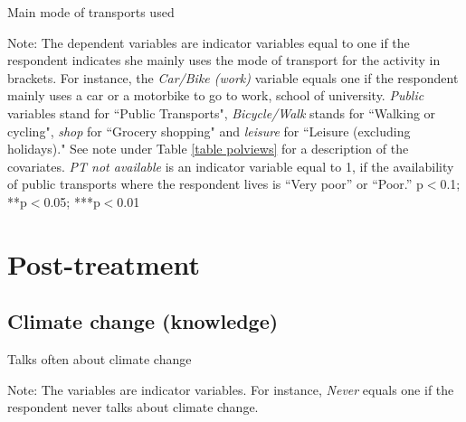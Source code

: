 \documentclass{article}
\begin{document}
\begin{landscape}
\begin{table}[h!]
	\caption{Main mode of transports used}
	\begin{center}
		\scalebox{0.6}{}
	\end{center}
	{\footnotesize Note: The dependent variables are indicator variables equal to one if the respondent indicates she mainly uses the mode of transport for the activity in brackets. For instance, the \textit{Car/Bike (work)} variable equals one if the respondent mainly uses a car or a motorbike to go to work, school of university. \textit{Public} variables stand for ``Public Transports", \textit{Bicycle/Walk} stands for ``Walking or cycling", \textit{shop} for ``Grocery shopping" and \textit{leisure} for ``Leisure (excluding holidays)."
	See note under Table \ref{table polviews} for a description of the covariates. \textit{PT not available} is an indicator variable equal to 1, if the availability of public transports where the respondent lives is ``Very poor'' or ``Poor.''
	\newline *p$<$0.1; **p$<$0.05; ***p$<$0.01}	
\end{table}	
\end{landscape}



\clearpage
\section{Post-treatment}
\subsection{Climate change (knowledge)}



\begin{table}[h!]
	\caption{Talks often about climate change}
	\begin{center}
		\scalebox{0.8}{}
	\end{center}
	{\footnotesize Note: The variables are indicator variables. For instance, \textit{Never} equals one if the respondent never talks about climate change.}
\end{table}		
\end{document}
